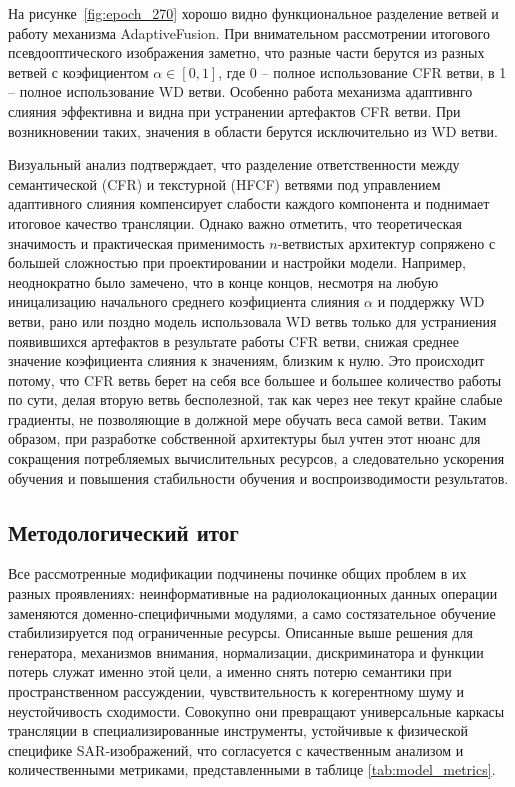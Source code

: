 На рисунке~\ref{fig:epoch_270} хорошо видно функциональное разделение ветвей и работу механизма AdaptiveFusion.
При внимательном рассмотрении итогового псевдооптического изображения заметно, что разные части берутся из разных ветвей с коэфициентом $\alpha \in [0, 1]$, где 0 -- полное использование CFR ветви, в 1 -- полное использование WD ветви.
Особенно работа механизма адаптивнго слияния эффективна и видна при устранении артефактов CFR ветви.
При возникновении таких, значения в области берутся исключительно из WD ветви.

Визуальный анализ подтверждает, что разделение ответственности между семантической (CFR) и текстурной (HFCF) ветвями под управлением адаптивного слияния компенсирует слабости каждого компонента и поднимает итоговое качество трансляции.
Однако важно отметить, что теоретическая значимость и практическая применимость $n$-ветвистых архитектур сопряжено с большей сложностью при проектировании и настройки модели.
Например, неоднократно было замечено, что в конце концов, несмотря на любую иницализацию начального среднего коэфициента слияния $\alpha$ и поддержку WD ветви, рано или поздно модель использовала WD ветвь только для устраниения появившихся артефактов в результате работы CFR ветви, снижая среднее значение коэфициента слияния к значениям, близким к нулю.
Это происходит потому, что CFR ветвь берет на себя все большее и большее количество работы по сути, делая вторую ветвь бесполезной, так как через нее текут крайне слабые градиенты, не позволяющие в должной мере обучать веса самой ветви.
Таким образом, при разработке собственной архитектуры был учтен этот нюанс для сокращения потребляемых вычислительных ресурсов, а следовательно ускорения обучения и повышения стабильности обучения и воспроизводимости результатов.

\subsection{Методологический итог}
\label{subsec:inspired_models_methodological_summary}
Все рассмотренные модификации подчинены починке общих проблем в их разных проявлениях: неинформативные на радиолокационных данных операции заменяются доменно-специфичными модулями, а само состязательное обучение стабилизируется под ограниченные ресурсы.
Описанные выше решения для генератора, механизмов внимания, нормализации, дискриминатора и функции потерь служат именно этой цели, а именно снять потерю семантики при пространственном рассуждении, чувствительность к когерентному шуму и неустойчивость сходимости.
Совокупно они превращают универсальные каркасы трансляции в специализированные инструменты, устойчивые к физической специфике SAR-изображений, что согласуется с качественным анализом и количественными метриками, представленными в таблице \ref{tab:model_metrics}.

